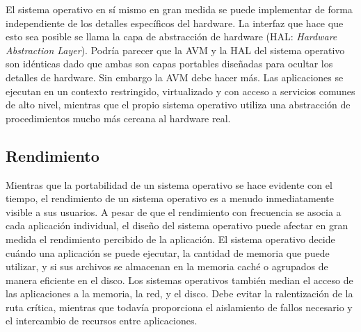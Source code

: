 \documentclass[10pt]{book}
\begin{document}
El sistema operativo en sí mismo en gran medida se puede implementar de forma independiente de los detalles específicos del hardware. La interfaz que hace que esto sea posible se llama la capa de abstracción de hardware (HAL: \textit{Hardware Abstraction Layer}). Podría parecer que la AVM y la  HAL del sistema operativo son idénticas dado que ambas son capas portables diseñadas para ocultar los detalles de hardware. Sin embargo la AVM debe hacer más. Las aplicaciones se ejecutan en un contexto restringido, virtualizado y con acceso a servicios comunes de alto nivel, mientras que el propio sistema operativo utiliza una abstracción de procedimientos mucho más cercana al hardware real.

\subsection{Rendimiento}
Mientras que la portabilidad de un sistema operativo se hace evidente con el tiempo, el rendimiento de un sistema operativo es a menudo inmediatamente visible a sus usuarios. A pesar de que el rendimiento con frecuencia se asocia a cada aplicación individual, el diseño del sistema operativo puede afectar en gran medida el rendimiento percibido de la aplicación. El sistema operativo decide cuándo una aplicación se puede ejecutar, la cantidad de memoria que puede utilizar, y si sus archivos se almacenan en la memoria caché o agrupados de manera eficiente en el disco. Los sistemas operativos también median el acceso de las aplicaciones a la memoria, la red, y el disco. Debe evitar la ralentización de la ruta crítica, mientras que todavía proporciona el aislamiento de fallos necesario y el intercambio de recursos entre aplicaciones.
\end{document}
